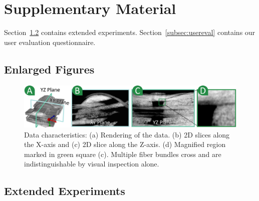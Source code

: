 \section{Supplementary Material}
\label{sec:sm}
Section~\ref{subsec:ext_exp} contains extended experiments.
Section~\ref{subsec:usereval} contains our user evaluation questionnaire.
\subsection{Enlarged Figures}
\label{subsec:enlarged_fig}
\begin{figure}[tb]
	\centering
	\includegraphics[width=\textwidth]{images_pvis/data-char.pdf}
	\caption{Data characteristics: (a) Rendering of the data. (b) 2D slices along the X-axis and (c) 2D slice along the Z-axis. (d) Magnified region marked in green square (c). Multiple fiber bundles cross and are indistinguishable by visual inspection alone. }
	\label{fig:data-char}
\end{figure}
\subsection{Extended Experiments}
\label{subsec:ext_exp}

